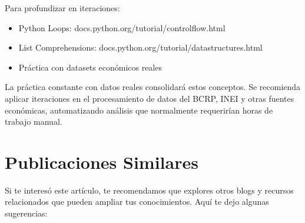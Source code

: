 \documentclass[
  doc,
  floatsintext,
  longtable,
  a4paper,
  nolmodern,
  notxfonts,
  notimes,
  12pt,
  colorlinks=true,linkcolor=blue,citecolor=blue,urlcolor=blue]{apa7}
\providecommand{\tightlist}{%
  \setlength{\itemsep}{0pt}\setlength{\parskip}{0pt}}
\begin{document}
Para profundizar en iteraciones:

\begin{itemize}
\tightlist
\item
  Python Loops: docs.python.org/tutorial/controlflow.html
\item
  List Comprehensions: docs.python.org/tutorial/datastructures.html
\item
  Práctica con datasets económicos reales
\end{itemize}

La práctica constante con datos reales consolidará estos conceptos. Se
recomienda aplicar iteraciones en el procesamiento de datos del BCRP,
INEI y otras fuentes económicas, automatizando análisis que normalmente
requerirían horas de trabajo manual.

\section{Publicaciones Similares}\label{publicaciones-similares}

Si te interesó este artículo, te recomendamos que explores otros blogs y
recursos relacionados que pueden ampliar tus conocimientos. Aquí te dejo
algunas sugerencias:
\end{document}

